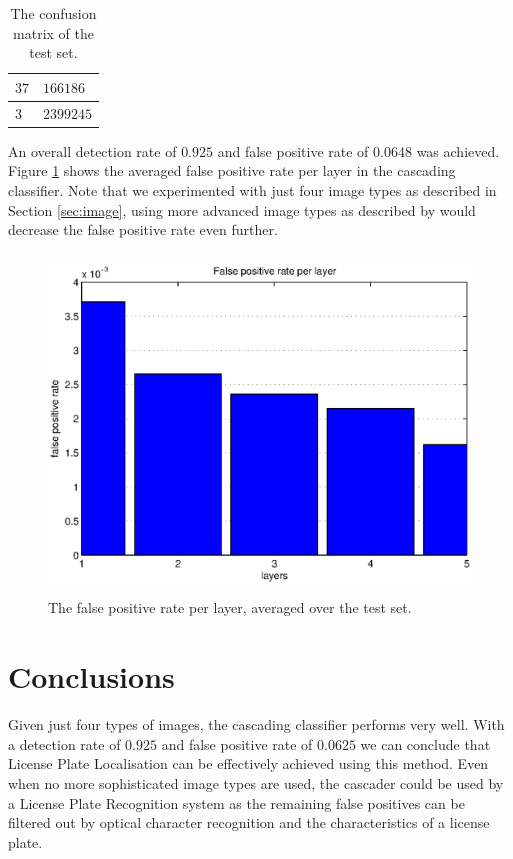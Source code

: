 \documentclass[a4paper,11pt]{article}
\begin{document}
\begin{table}[!ht]
\centering
\begin{tabular}{|l|l|}
\hline
$37$ & $166186$ \\
\hline
$3$  & $2399245$ \\
\hline
\end{tabular}
\caption{The confusion matrix of the test set.}
\label{tab:conf}
\end{table}
An overall detection rate of $0.925$ and false positive rate of
$0.0648$ was achieved. Figure \ref{fig:fprate} shows
the averaged false positive rate per layer in the cascading classifier. Note
that we experimented with just four image types as described in Section
\ref{sec:image}, using more advanced image types as described by \cite{naturaltext}
would decrease the false positive rate even further.
\begin{figure}[!ht]
\centering
\includegraphics[height=9cm]{img/fprate}
\caption{The false positive rate per layer, averaged over the test set.}
\label{fig:fprate}
\end{figure}

\section{Conclusions} \label{sec:conc}
Given just four types of images, the cascading classifier performs very well.
With a detection rate of $0.925$ and false positive rate of $0.0625$ we can
conclude that License Plate Localisation can be effectively achieved using this
method. Even when no more sophisticated image types are used, the cascader
could be used by a License Plate Recognition system as the remaining false
positives can be filtered out by optical character recognition and the
characteristics of a license plate.
\newpage
\renewcommand\bibname{References}


\end{document}
